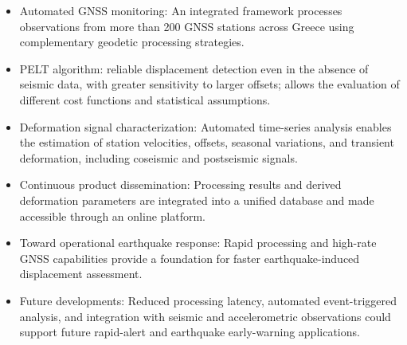 \begin{frame}
\begin{small}
\begin{itemize}
    \item Automated GNSS monitoring: An integrated framework processes observations from more than 200 GNSS stations across Greece using complementary geodetic processing strategies.
    \item PELT algorithm: reliable displacement detection even in the absence of seismic data, with greater sensitivity to larger offsets; allows the evaluation of different cost functions and statistical assumptions.
    \item Deformation signal characterization: Automated time-series analysis enables the estimation of station velocities, offsets, seasonal variations, and transient deformation, including coseismic and postseismic signals.
    \item Continuous product dissemination: Processing results and derived deformation parameters are integrated into a unified database and made accessible through an online platform.
    \item Toward operational earthquake response: Rapid processing and high-rate GNSS capabilities provide a foundation for faster earthquake-induced displacement assessment.
    \item Future developments: Reduced processing latency, automated event-triggered analysis, and integration with seismic and accelerometric observations could support future rapid-alert and earthquake early-warning applications.
  \end{itemize}
  \end{small}
\end{frame}
\note{}

